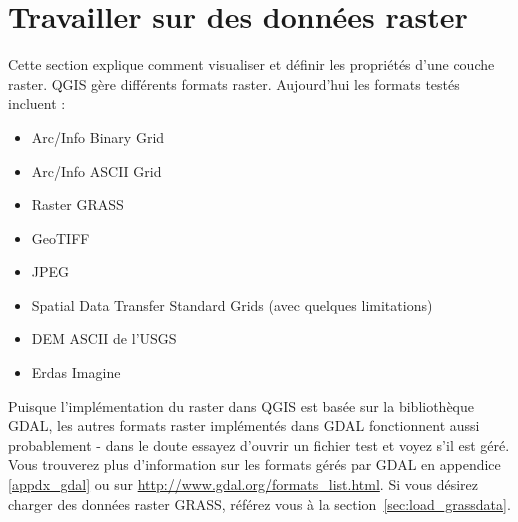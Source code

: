 
\section{Travailler sur des donn\'ees raster}\label{label_raster}


Cette section explique comment visualiser et d\'efinir les propri\'et\'es d'une couche
raster. QGIS g\`ere diff\'erents formats raster. Aujourd'hui les formats test\'es
incluent :
\begin{itemize}
\item Arc/Info Binary Grid
\item Arc/Info ASCII Grid
\item Raster GRASS
\item GeoTIFF
\item JPEG
\item Spatial Data Transfer Standard Grids (avec quelques limitations)
\item DEM ASCII de l'USGS
\item Erdas Imagine
\end{itemize}

Puisque l'impl\'ementation du raster dans QGIS est bas\'ee sur la biblioth\`eque
GDAL, les autres formats raster impl\'ement\'es dans GDAL fonctionnent aussi
probablement - dans le doute essayez d'ouvrir un fichier test et voyez s'il est
g\'er\'e. Vous trouverez plus d'information sur les formats g\'er\'es par GDAL  en
appendice \ref{appdx_gdal}  ou sur
\url{http://www.gdal.org/formats_list.html}. Si vous d\'esirez charger des
donn\'ees raster GRASS, r\'ef\'erez vous \`a la section~\ref{sec:load_grassdata}.

